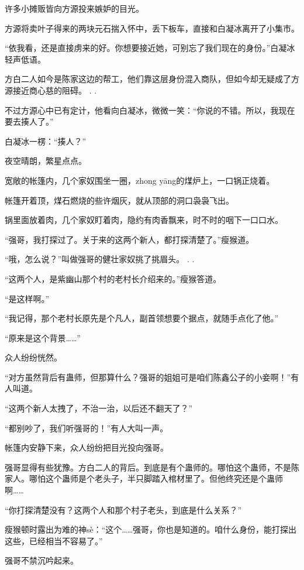
\begin{this_body}

许多小摊贩皆向方源投来嫉妒的目光。

方源将卖叶子得来的两块元石揣入怀中，丢下板车，直接和白凝冰离开了小集市。

“依我看，还是直接虏来的好。你想要接近她，可别忘了我们现在的身份。”白凝冰轻声低语。

方白二人如今是陈家这边的帮工，他们靠这层身份混入商队，但如今却无疑成了方源接近商心慈的阻碍。 . .

不过方源心中已有定计，他看向白凝冰，微微一笑：“你说的不错。所以，我现在要去揍人了。”

白凝冰一楞：“揍人？”

夜空晴朗，繁星点点。

宽敞的帐篷内，几个家奴围坐一圈，zhong yāng的煤炉上，一口锅正烧着。

帐篷开着顶，煤石燃烧的些许烟灰，就从顶部的洞口袅袅飞出。

锅里面放着肉，几个家奴盯着肉，隐约有肉香飘来，时不时的咽下一口口水。

“强哥，我打探过了。关于来的这两个新人，都打探清楚了。”瘦猴道。

“哦，怎么说？”叫做强哥的健壮家奴挑了挑眉头。 . .

“这两个人，是紫幽山那个村的老村长介绍来的。”瘦猴答道。

“是这样啊。”

“我记得，那个老村长原先是个凡人，副首领想要个据点，就随手点化了他。”

“原来是这个背景……”

众人纷纷恍然。

“对方虽然背后有蛊师，但那算什么？强哥的姐姐可是咱们陈鑫公子的小妾啊！”有人叫道。

“这两个新人太拽了，不治一治，以后还不翻天了？”

“都别吵了，我们听强哥的！”有人大叫一声。

帐篷内安静下来，众人纷纷把目光投向强哥。

强哥显得有些犹豫。方白二人的背后。到底是有个蛊师的。哪怕这个蛊师，不是陈家人。哪怕这个蛊师是个老头子，半只脚踏入棺材里了。但他终究还是个蛊师啊……

“你打探清楚没有？这两个人和那个村子老头，到底是什么关系？”

瘦猴顿时露出为难的神sè：“这个……强哥，你也是知道的。咱什么身份，能打探出这些，已经相当不容易了。”

强哥不禁沉吟起来。


\end{this_body}
